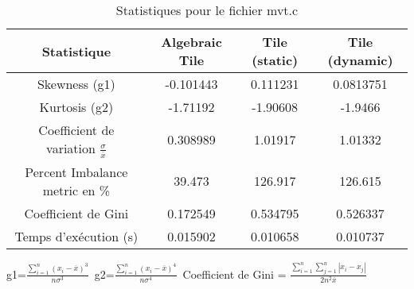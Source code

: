 \documentclass{article}
\begin{document}
\begin{table}[htbp]
  \centering
  \caption{Statistiques pour le fichier mvt.c}
  \begin{tabular}{|c|c|c|c|}
    \hline
    Statistique & Algebraic Tile & Tile (static) & Tile (dynamic) \\ 
    \hline
    Skewness (g1)  & -0.101443 & 0.111231 & 0.0813751 \\ 
    Kurtosis (g2)  & -1.71192 & -1.90608 & -1.9466 \\ 
    Coefficient de variation $ \frac{\sigma}{\overline{x}} $ & 0.308989 & 1.01917 & 1.01332\\ 
    Percent Imbalance metric en \% & 39.473 & 126.917 & 126.615\\ 
    Coefficient de Gini  & 0.172549 & 0.534795 & 0.526337\\ 
    Temps d'exécution (s) &  0.015902    &  0.010658   &  0.010737   \\ 

    \hline
  \end{tabular}
\end{table}
g1=$ \frac{\sum_{i=1}^{n} (x_i - \overline{x})^3}{n\sigma^3} $\
g2=$ \frac{\sum_{i=1}^{n} (x_i - \overline{x})^4}{n\sigma^4} $\
Coefficient de Gini = $ \frac{\sum_{i=1}^{n}\sum_{j=1}^{n} |x_i - x_j|}{2n^2\overline{x}} $\
\newpage
\end{document}
